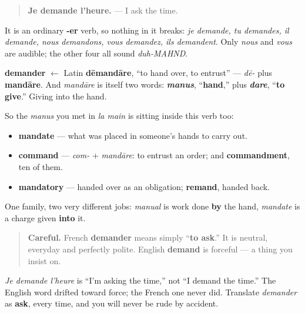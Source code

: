 \begin{quote}
\textbf{Je demande l'heure.} — I ask the time.
\end{quote}

It is an ordinary \textbf{-er} verb, so nothing in it breaks: \emph{je demande, tu demandes, il demande, nous demandons, vous demandez, ils demandent}. Only \emph{nous} and \emph{vous} are audible; the other four all sound \emph{duh-MAHND}.

\begin{cousinweb}
\textbf{demander} $\leftarrow$ Latin \textbf{dēmandāre}, \textquotedblleft{}to hand over, to entrust\textquotedblright{} — \emph{dē-} plus \textbf{mandāre}. And \emph{mandāre} is itself two words: \emph{\textbf{manus}}, \textquotedblleft{}\textbf{hand},\textquotedblright{} plus \emph{\textbf{dare}}, \textquotedblleft{}\textbf{to give}.\textquotedblright{} Giving into the hand.

So the \emph{manus} you met in \emph{la main} is sitting inside this verb too:

\begin{itemize}
\raggedright
  \item \textbf{mandate} — what was placed in someone's hands to carry out.
  \item \textbf{command} — \emph{com-} + \emph{mandāre}: to entrust an order; and \textbf{commandment}, ten of them.
  \item \textbf{mandatory} — handed over as an obligation; \textbf{remand}, handed back.
\end{itemize}

One family, two very different jobs: \emph{manual} is work done \textbf{by} the hand, \emph{mandate} is a charge given \textbf{into} it.
\end{cousinweb}

\begin{culture}
\begin{quote}
\textbf{Careful.} French \textbf{demander} means simply \textquotedblleft{}\textbf{to ask}.\textquotedblright{} It is neutral, everyday and perfectly polite. English \textbf{demand} is forceful — a thing you insist on.
\end{quote}

\emph{Je demande l'heure} is \textquotedblleft{}I'm asking the time,\textquotedblright{} not \textquotedblleft{}I demand the time.\textquotedblright{} The English word drifted toward force; the French one never did. Translate \emph{demander} as \textbf{ask}, every time, and you will never be rude by accident.
\end{culture}

